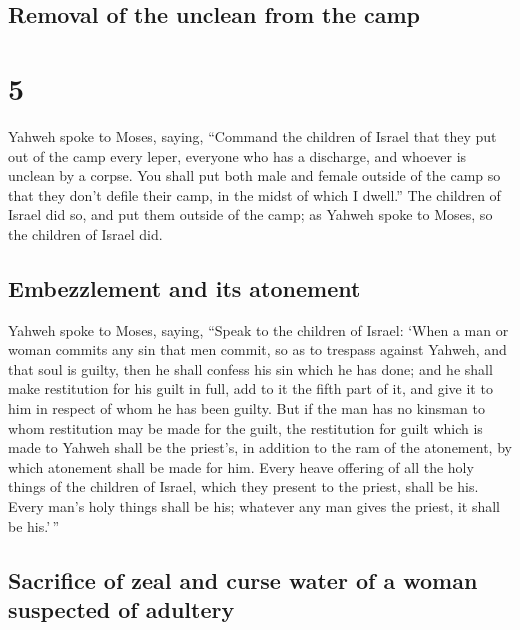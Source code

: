 \hypertarget{removal-of-the-unclean-from-the-camp}{%
\subsection{Removal of the unclean from the
camp}\label{removal-of-the-unclean-from-the-camp}}

\hypertarget{section-4}{%
\section{5}\label{section-4}}

 Yahweh spoke to Moses, saying,  ``Command
the children of Israel that they put out of the camp every leper,
everyone who has a discharge, and whoever is unclean by a corpse.
 You shall put both male and female outside of the camp so
that they don't defile their camp, in the midst of which I dwell.''
 The children of Israel did so, and put them outside of
the camp; as Yahweh spoke to Moses, so the children of Israel did.

\hypertarget{embezzlement-and-its-atonement}{%
\subsection{Embezzlement and its
atonement}\label{embezzlement-and-its-atonement}}

 Yahweh spoke to Moses, saying,  ``Speak to
the children of Israel: `When a man or woman commits any sin that men
commit, so as to trespass against Yahweh, and that soul is guilty,
 then he shall confess his sin which he has done; and he
shall make restitution for his guilt in full, add to it the fifth part
of it, and give it to him in respect of whom he has been guilty.
 But if the man has no kinsman to whom restitution may be
made for the guilt, the restitution for guilt which is made to Yahweh
shall be the priest's, in addition to the ram of the atonement, by which
atonement shall be made for him.  Every heave offering of
all the holy things of the children of Israel, which they present to the
priest, shall be his.  Every man's holy things shall be
his; whatever any man gives the priest, it shall be his.'\,''

\hypertarget{sacrifice-of-zeal-and-curse-water-of-a-woman-suspected-of-adultery}{%
\subsection{Sacrifice of zeal and curse water of a woman suspected of
adultery}\label{sacrifice-of-zeal-and-curse-water-of-a-woman-suspected-of-adultery}}

